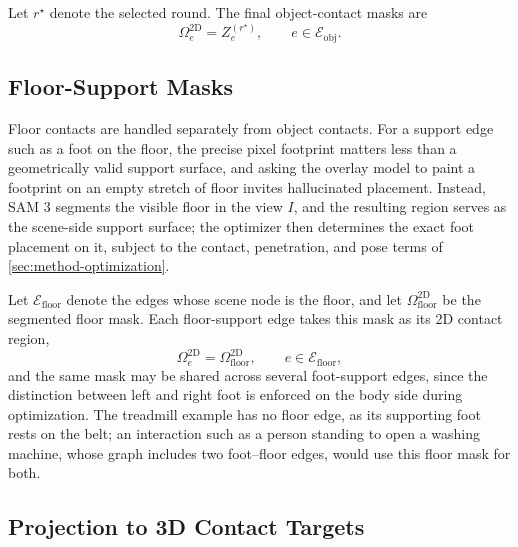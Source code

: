 Let $r^{\star}$ denote the selected round. The final object-contact masks are
\begin{equation}
\label{eq:final-object-contact-masks}
\Omega_e^{\mathrm{2D}} = Z_e^{(r^{\star})}, \qquad e \in \mathcal{E}_{\mathrm{obj}}.
\end{equation}

\subsection{Floor-Support Masks}
\label{sec:method-floor-support-masks}

Floor contacts are handled separately from object contacts. For a support edge such as a foot on the floor, the precise pixel footprint matters less than a geometrically valid support surface, and asking the overlay model to paint a footprint on an empty stretch of floor invites hallucinated placement. Instead, SAM 3 segments the visible floor in the view $I$, and the resulting region serves as the scene-side support surface; the optimizer then determines the exact foot placement on it, subject to the contact, penetration, and pose terms of \cref{sec:method-optimization}.

Let $\mathcal{E}_{\mathrm{floor}}$ denote the edges whose scene node is the floor, and let $\Omega_{\mathrm{floor}}^{\mathrm{2D}}$ be the segmented floor mask. Each floor-support edge takes this mask as its 2D contact region,
\begin{equation}
\label{eq:floor-mask-2d}
\Omega_e^{\mathrm{2D}} = \Omega_{\mathrm{floor}}^{\mathrm{2D}}, \qquad e \in \mathcal{E}_{\mathrm{floor}},
\end{equation}
and the same mask may be shared across several foot-support edges, since the distinction between left and right foot is enforced on the body side during optimization. The treadmill example has no floor edge, as its supporting foot rests on the belt; an interaction such as a person standing to open a washing machine, whose graph includes two foot--floor edges, would use this floor mask for both.

\subsection{Projection to 3D Contact Targets}
\label{sec:method-contact-projection}

